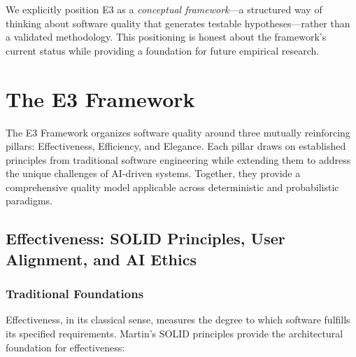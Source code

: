 \documentclass[11pt,a4paper]{article}
\begin{document}
We explicitly position E3 as a \emph{conceptual framework}---a structured way of thinking about software quality that generates testable hypotheses---rather than a validated methodology. This positioning is honest about the framework's current status while providing a foundation for future empirical research.








\section{The E3 Framework}

The E3 Framework organizes software quality around three mutually reinforcing pillars: Effectiveness, Efficiency, and Elegance. Each pillar draws on established principles from traditional software engineering while extending them to address the unique challenges of AI-driven systems. Together, they provide a comprehensive quality model applicable across deterministic and probabilistic paradigms.



\subsection{Effectiveness: SOLID Principles, User Alignment, and AI Ethics}

\subsubsection{Traditional Foundations}

Effectiveness, in its classical sense, measures the degree to which software fulfills its specified requirements. Martin's SOLID principles \cite{martin2017clean} provide the architectural foundation for effectiveness:
\end{document}
